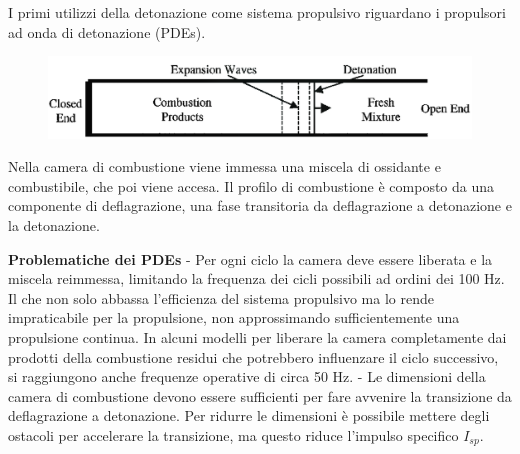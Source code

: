 \begin{frame}
  I primi utilizzi della detonazione come sistema propulsivo riguardano i propulsori ad onda di detonazione (PDEs). 
    \begin{figure}[H]
      \centering
      \includegraphics[scale=.2]{pde_scheme.png}
    \end{figure} 
    Nella camera di combustione viene immessa una miscela di ossidante e combustibile, che poi viene accesa. Il profilo di combustione è composto da una componente di deflagrazione, una fase transitoria da deflagrazione a detonazione e la detonazione.
\end{frame}
\begin{frame}
  \textbf{Problematiche dei PDEs}
  - Per ogni ciclo la camera deve essere liberata e la miscela reimmessa, limitando la frequenza dei cicli possibili ad ordini dei 100 Hz. Il che non solo abbassa l'efficienza del sistema propulsivo ma lo rende impraticabile per la propulsione, non approssimando sufficientemente una propulsione continua. In alcuni modelli per liberare la camera completamente dai prodotti della combustione residui che potrebbero influenzare il ciclo successivo, si raggiungono anche frequenze operative di circa 50 Hz. 
  - Le dimensioni della camera di combustione devono essere sufficienti per fare avvenire la transizione da deflagrazione a detonazione. Per ridurre le dimensioni è possibile mettere degli ostacoli per accelerare la transizione, ma questo riduce l'impulso specifico $ I _{sp} $.
\end{frame}
